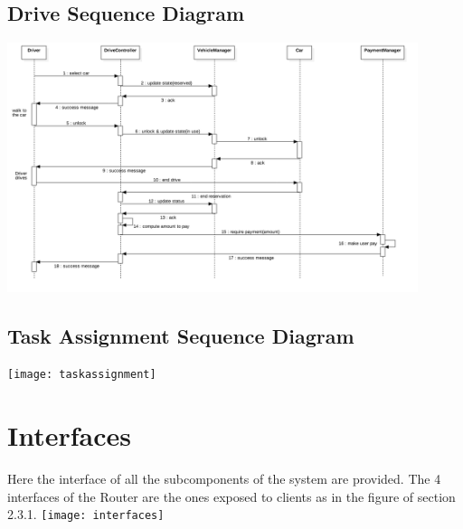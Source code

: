 \subsection{Drive Sequence Diagram}
\includegraphics[width=12cm,keepaspectratio]{drive}
\subsection{Task Assignment Sequence Diagram}
\texttt{[image: taskassignment]}
\newpage
\section{Interfaces}
Here the interface of all the subcomponents of the system are provided. The 4 interfaces of the Router are the ones exposed to clients as in the figure of section 2.3.1.
\texttt{[image: interfaces]}

